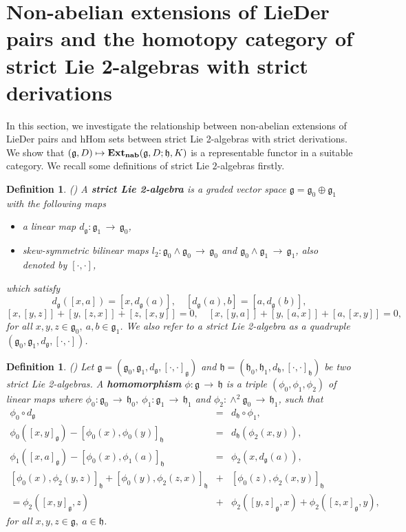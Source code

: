 \documentclass[12pt]{amsart}
\newtheorem{defi}[thm]{Definition}
\newcommand{\lon }{\,\rightarrow\,}
\newcommand{\g}{\mathfrak g}
\newcommand{\h}{\mathfrak h}
\newcommand{\LD}{{\rm LieDer }}
\begin{document}
\section{Non-abelian extensions of \LD pairs and the homotopy category of strict Lie 2-algebras with strict derivations}
In this section, we investigate the relationship between non-abelian extensions of \LD pairs and hHom sets between strict Lie 2-algebras with strict derivations. We show that $(\g,D)\mapsto{\rm{\bf Ext_{nab}}}(\g,D;\h,K)$ is a representable functor in a suitable category. We recall some definitions of strict Lie $2$-algebras firstly. 
\begin{defi}{\rm(\cite{Baez})}
A {\bf strict Lie 2-algebra} is a graded vector space $\g=\g_{0}\oplus\g_{1}$ with the following maps 
\begin{itemize}
  \item a linear map $d_\g:\g_{1}\lon \g_{0}$,
  \item skew-symmetric bilinear maps $l_{2}:\g_{0}\wedge \g_{0}\lon \g_{0}$ and $\g_{0}\wedge \g_{1}\lon \g_{1}$, also denoted by $[\cdot,\cdot]$,
\end{itemize}
which satisfy
\begin{equation*}\label{eqLie2 1}
d_\g([x,a])=[x,d_\g (a)], \quad [d_\g(a),b]=[a,d_\g (b)],
\end{equation*}
\begin{equation*}\label{eqLie2 2}
[x,[y,z]]+[y,[z,x]]+[z,[x,y]]=0,
\quad
[x,[y,a]]+[y,[a,x]]+[a,[x,y]]=0,
\end{equation*}
for all $x,y,z\in \g_{0},\  a,b\in \g_{1}$. We also refer to a strict Lie 2-algebra as a quadruple $(\g_{0},\g_{1},d_\g,[\cdot,\cdot])$.
\end{defi}
\begin{defi}{\rm(\cite{Baez})}
Let $\g=(\g_{0},\g_{1},d_{\g},[\cdot,\cdot]_{\g})$ and $\h= (\h_{0},\h_{1},d_{\h},[\cdot,\cdot]_{\h})$ be two strict Lie 2-algebras. A {\bf homomorphism} $\phi:\g \lon \h$ is a triple $(\phi_{0},\phi_{1},\phi_{2})$ of linear maps where $\phi_{0}:\g_{0}\lon \h_{0},\  \phi_{1}:\g_{1}\lon \h_{1}$ and $\phi_{2}:\wedge^2\g_{0}\lon \h_{1}$, such that 
\begin{eqnarray}
\label{eqLie2hom1}\phi_{0}\circ d_{\g}&=&d_{\h}\circ \phi_{1},\\
\label{eqLie2hom2}\phi_{0}([x,y]_{\g})-[\phi_{0}(x),\phi_{0}(y)]_{\h}&=&d_{\h}(\phi_{2}(x,y)),\\
\label{eqLie2hom3}\phi_{1}([x,a]_{\g})-[\phi_{0}(x),\phi_{1}(a)]_{\h}&=&\phi_{2}(x,d_{\g}(a)),\\
\label{eqLie2hom4}
[\phi_{0}(x),\phi_{2}(y,z)]_{\h}+[\phi_{0}(y),\phi_{2}(z,x)]_{\h}&+&[\phi_{0}(z),\phi_{2}(x,y)]_{\h}\\
\nonumber=\phi_{2}([x,y]_{\g},z)&+&\phi_{2}([y,z]_{\g},x)+\phi_{2}([z,x]_{\g},y),
\end{eqnarray}
for all $x,y,z\in \g,\  a\in \h$.
\end{defi}
\end{document}
